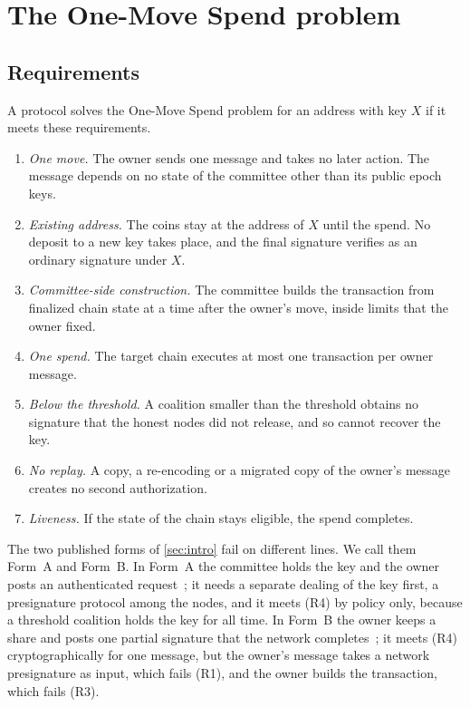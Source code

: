 \section{The One-Move Spend problem}\label{sec:problem}

\subsection{Requirements}

A protocol solves the One-Move Spend problem for an address with key $X$ if it meets these requirements.

\begin{enumerate}[leftmargin=1.7em,label=\textup{(R\arabic*)}]
\item \emph{One move.} The owner sends one message and takes no later action. The message depends on no state of the committee other than its public epoch keys.
\item \emph{Existing address.} The coins stay at the address of $X$ until the spend. No deposit to a new key takes place, and the final signature verifies as an ordinary signature under $X$.
\item \emph{Committee-side construction.} The committee builds the transaction from finalized chain state at a time after the owner's move, inside limits that the owner fixed.
\item \emph{One spend.} The target chain executes at most one transaction per owner message.
\item \emph{Below the threshold.} A coalition smaller than the threshold obtains no signature that the honest nodes did not release, and so cannot recover the key.
\item \emph{No replay.} A copy, a re-encoding or a migrated copy of the owner's message creates no second authorization.
\item \emph{Liveness.} If the state of the chain stays eligible, the spend completes.
\end{enumerate}

The two published forms of \cref{sec:intro} fail on different lines. We call them Form~A and Form~B. In Form~A the committee holds the key and the owner posts an authenticated request~\cite{GS22,TroutPP}; it needs a separate dealing of the key first, a presignature protocol among the nodes, and it meets (R4) by policy only, because a threshold coalition holds the key for all time. In Form~B the owner keeps a share and posts one partial signature that the network completes~\cite{FMMSS25,IkaDocs}; it meets (R4) cryptographically for one message, but the owner's message takes a network presignature as input, which fails (R1), and the owner builds the transaction, which fails (R3).

